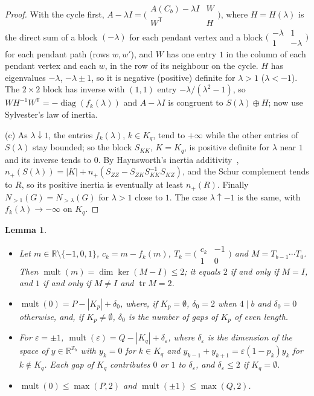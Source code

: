 \documentclass[11pt]{article}
\newtheorem{lemma}{Lemma}[section]
\theoremstyle{definition}
\theoremstyle{remark}
\DeclareMathOperator{\mult}{mult}
\DeclareMathOperator{\tr}{tr}
\DeclareMathOperator{\diag}{diag}
\newcommand{\Z}{\mathbb Z}
\newcommand{\R}{\mathbb R}
\begin{document}
\begin{proof}
With the cycle first,
$A-\lambda I=\bigl(\begin{smallmatrix}A(C_b)-\lambda I&W\\W^{\mathsf
T}&H\end{smallmatrix}\bigr)$, where $H=H(\lambda)$ is the direct sum of a block
$(-\lambda)$ for each pendant vertex and a block
$\bigl(\begin{smallmatrix}-\lambda&1\\1&-\lambda\end{smallmatrix}\bigr)$ for
each pendant path (rows $w,w'$), and $W$ has one entry $1$ in the column of
each pendant vertex and each $w$, in the row of its neighbour on the cycle. $H$ has
eigenvalues $-\lambda$, $-\lambda\pm1$, so it is negative (positive) definite for
$\lambda>1$ ($\lambda<-1$). The $2\times2$ block has inverse with $(1,1)$ entry
$-\lambda/(\lambda^2-1)$, so $WH^{-1}W^{\mathsf T}=-\diag(f_k(\lambda))$ and
$A-\lambda I$ is congruent to $S(\lambda)\oplus H$; now use Sylvester's law of
inertia.

(c) As $\lambda\downarrow1$, the entries $f_k(\lambda)$, $k\in K_q$, tend to
$+\infty$ while the other entries of $S(\lambda)$ stay bounded; so the block
$S_{KK}$, $K=K_q$, is positive definite for $\lambda$ near $1$ and its inverse
tends to $0$. By Haynsworth's inertia additivity~\cite{hay},
$n_+(S(\lambda))=|K|+n_+(S_{ZZ}-S_{ZK}S_{KK}^{-1}S_{KZ})$, and the Schur
complement tends to $R$, so its positive inertia is eventually at least
$n_+(R)$. Finally $N_{>1}(G)=N_{>\lambda}(G)$ for $\lambda>1$ close to $1$. The
case $\lambda\uparrow-1$ is the same, with $f_k(\lambda)\to-\infty$ on $K_q$.
\end{proof}

\begin{lemma}\label{lem:mult}
\begin{itemize}
\item[(a)] Let $m\in\R\setminus\{-1,0,1\}$, $c_k=m-f_k(m)$,
 $T_k=\bigl(\begin{smallmatrix}c_k&-1\\1&0\end{smallmatrix}\bigr)$ and
 $M=T_{b-1}\cdots T_0$. Then $\mult(m)=\dim\ker(M-I)\le2$; it equals $2$ if
 and only if $M=I$, and $1$ if and only if $M\ne I$ and $\tr M=2$.
\item[(b)] $\mult(0)=P-|K_p|+\delta_0$, where, if $K_p=\emptyset$, $\delta_0=2$
 when $4\mid b$ and $\delta_0=0$ otherwise, and, if $K_p\ne\emptyset$,
 $\delta_0$ is the number of gaps of $K_p$ of even length.
\item[(c)] For $\varepsilon=\pm1$, $\mult(\varepsilon)=Q-|K_q|+\delta_\varepsilon$,
 where $\delta_\varepsilon$ is the dimension of the space of $y\in\R^{\Z_b}$
 with $y_k=0$ for $k\in K_q$ and $y_{k-1}+y_{k+1}=\varepsilon(1-p_k)y_k$ for
 $k\notin K_q$. Each gap of $K_q$ contributes $0$ or $1$ to
 $\delta_\varepsilon$, and $\delta_\varepsilon\le2$ if $K_q=\emptyset$.
\item[(d)] $\mult(0)\le\max(P,2)$ and $\mult(\pm1)\le\max(Q,2)$.
\end{itemize}
\end{lemma}
\end{document}
